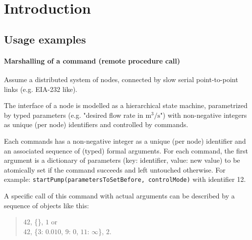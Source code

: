 
\section{Introduction}


\subsection{Usage examples}

\paragraph{Marshalling of a command (remote procedure call)}

Assume a distributed system of nodes, connected by slow serial point-to-point links (e.g. EIA-232 like).

The interface of a node is modelled as a hierarchical state machine, parametrized by typed parameters
(e.g. "desired flow rate in $\text{m}^3/\text{s}$") with non-negative integers as unique (per node) identifiers
and controlled by commands.

Each commands has a non-negative integer as a unique (per node) identifier and an associated sequence of
(typed) formal arguments.
For each command, the first argument is a dictionary of parameters (key: identifier, value: new value) to be
atomically set if the command succeeds and left untouched otherwise.
For example: \texttt{startPump(parametersToSetBefore, controlMode)} with identifier 12.

\medskip
\begin{BeginParPenalty}
    A specific call of this command with actual arguments can be described by a sequence of objects like this:
    \begin{quote}
        $42$, \{\}, $1$ or \\
        $42$, \{$3$: $0.010$, $9$: $0$, $11$: $\infty$\}, $2$.
    \end{quote}
\end{BeginParPenalty}

